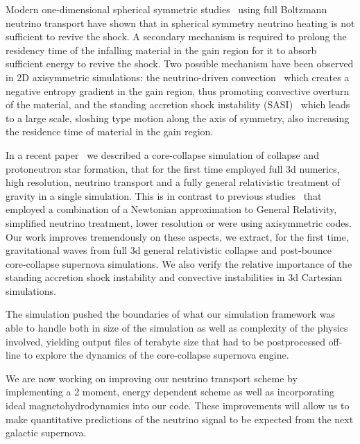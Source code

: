 \documentclass[12pt]{article}
\begin{document}
Modern one-dimensional spherical symmetric
studies~\cite{2001PhRvD..63j4003L} %
using full Boltzmann neutrino transport have shown that in spherical symmetry
neutrino heating
is not sufficient to revive the shock.
A secondary mechanism is required
to prolong the residency time of the infalling material in the gain region for
it to absorb sufficient energy to revive the shock.
Two possible mechanism have been observed in 2D axisymmetric
simulations: the neutrino-driven convection~\cite{1994ApJ...435..339H} %
which creates a negative entropy gradient in
the gain region, thus promoting convective overturn of the material,
and the standing accretion shock instability
(SASI)~\cite{2003ApJ...584..971B} %
which leads to a large scale, sloshing type motion along the axis
of symmetry, also increasing the residence time of material in the gain
region. 

In a recent paper~\cite{2012arXiv1210.6674O} we described a
core-collapse simulation of  collapse and
protoneutron star formation, that for the first time employed full 3d numerics,
high
resolution, neutrino transport and a fully general relativistic
treatment of gravity in a single simulation. This is in contrast to previous
studies~\cite{Kuroda:2012nc,Nordhaus:2010uk,Mueller:2012ak} that
employed a combination of a Newtonian approximation to General Relativity,
simplified neutrino
treatment, lower resolution or were using axisymmetric codes. Our work improves
tremendously on these aspects, we extract, for the first time, 
gravitational waves from full 3d general relativistic collapse and post-bounce
core-collapse supernova simulations. We also verify the relative importance of
the standing accretion shock instability and convective instabilities in 3d
Cartesian simulations. 

The simulation pushed the boundaries of what our
simulation framework was able to handle both in size of the simulation as
well as complexity of the physics involved, yielding output files of terabyte
size that had to be postprocessed off-line to explore the dynamics of the
core-collapse supernova engine.

We are now working on improving our
neutrino transport scheme by implementing a 2 moment, energy dependent scheme
as well as incorporating ideal magnetohydrodynamics into our code. These
improvements will allow us to make quantitative predictions of the neutrino
signal to be expected from the next galactic supernova. 
\end{document}
